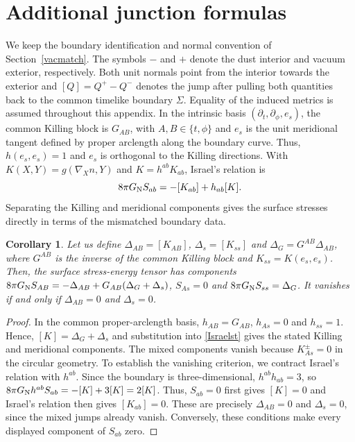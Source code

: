 \documentclass[amsmath,amsfonts,amssymb,aps,pra,superscriptaddress,10pt]{revtex4-2}
\numberwithin{equation}{section}
\theoremstyle{plain}
\newtheorem{corollary}{Corollary}
\theoremstyle{definition}
\theoremstyle{remark}
\theoremstyle{definition}
\begin{document}
\section{Additional junction formulas}\label{suppaddjunc}

We keep the boundary identification and normal convention of Section~\ref{vacmatch}. The symbols $-$ and $+$ denote the dust interior and vacuum exterior, respectively. Both unit normals point from the interior towards the exterior and $[Q]=Q^+-Q^-$ denotes the jump after pulling both quantities back to the common timelike boundary $\Sigma$. Equality of the induced metrics is assumed throughout this appendix. In the intrinsic basis $(\partial_t,\partial_\phi,e_s)$, the common Killing block is $G_{AB}$, with $A,B\in\{t,\phi\}$ and $e_s$ is the unit meridional tangent defined by proper arclength along the boundary curve. Thus, $h(e_s,e_s)=1$ and $e_s$ is orthogonal to the Killing directions. With $K(X,Y)=g(\nabla_X n,Y)$ and $K=h^{ab}K_{ab}$, Israel's relation is
\begin{equation}\label{Israelst}
8\pi G_{\rm{N}}S_{ab}=-[K_{ab}]+h_{ab}[K].
\end{equation}
Separating the Killing and meridional components gives the surface stresses directly in terms of the mismatched boundary data.

\begin{corollary}
Let us define $\Delta_{AB}=[K_{AB}]$, $\Delta_s=[K_{ss}]$ and $\Delta_G=G^{AB}\Delta_{AB}$, where $G^{AB}$ is the inverse of the common Killing block and $K_{ss}=K(e_s,e_s)$. Then, the surface stress-energy tensor has components $8\pi G_{\rm{N}}S_{AB}=-\Delta_{AB}+G_{AB}(\Delta_G+\Delta_s)$, $S_{As}=0$ and $8\pi G_{\rm{N}}S_{ss}=\Delta_G$. It vanishes if and only if $\Delta_{AB}=0$ and $\Delta_s=0$.
\end{corollary}

\begin{proof}
In the common proper-arclength basis, $h_{AB}=G_{AB}$, $h_{As}=0$ and $h_{ss}=1$. Hence, $[K]=\Delta_G+\Delta_s$ and substitution into \eqref{Israelst} gives the stated Killing and meridional components. The mixed components vanish because $K_{As}^\pm=0$ in the circular geometry. To establish the vanishing criterion, we contract Israel's relation with $h^{ab}$. Since the boundary is three-dimensional, $h^{ab}h_{ab}=3$, so $
8\pi G_{\rm{N}}h^{ab}S_{ab}=-[K]+3[K]=2[K]$. Thus, $S_{ab}=0$ first gives $[K]=0$ and Israel's relation then gives $[K_{ab}]=0$. These are precisely $\Delta_{AB}=0$ and $\Delta_s=0$, since the mixed jumps already vanish. Conversely, these conditions make every displayed component of $S_{ab}$ zero.
\end{proof}
\end{document}

